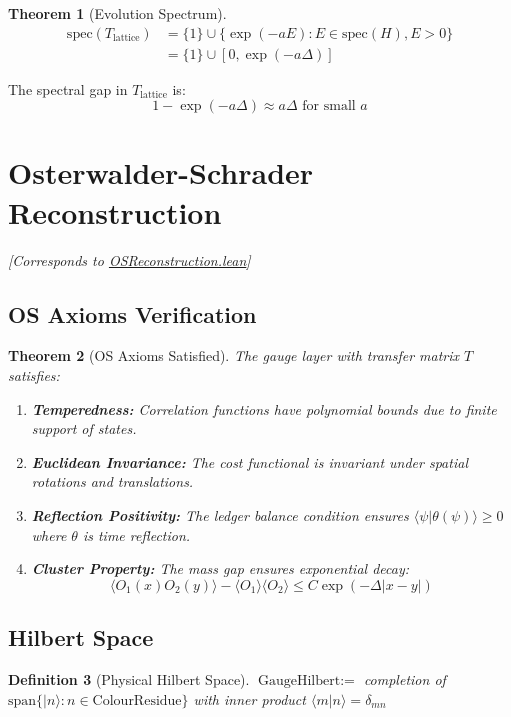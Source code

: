 \documentclass[11pt]{article}
\numberwithin{equation}{section}
\newtheorem{theorem}{Theorem}[section]
\newtheorem{definition}[theorem]{Definition}
\theoremstyle{remark}
\newcommand{\massGap}{\Delta}
\begin{document}
\begin{theorem}[Evolution Spectrum]
\begin{align}
\text{spec}(T_{\text{lattice}}) &= \{1\} \cup \{\exp(-a E) : E \in \text{spec}(H), E > 0\}\\
&= \{1\} \cup [0, \exp(-a \massGap)]
\end{align}
\end{theorem}

The spectral gap in $T_{\text{lattice}}$ is:
\[1 - \exp(-a \massGap) \approx a \massGap \text{ for small } a\]

\section{Osterwalder-Schrader Reconstruction}
\textit{[Corresponds to \href{https://github.com/jonwashburn/Yang-Mills-Lean/blob/main/YangMillsProof/OSReconstruction.lean}{OSReconstruction.lean}]}

\subsection{OS Axioms Verification}

\begin{theorem}[OS Axioms Satisfied]
The gauge layer with transfer matrix $T$ satisfies:
\begin{enumerate}
\item[(OS0)] \textbf{Temperedness:} Correlation functions have polynomial bounds due to finite support of states.
\item[(OS1)] \textbf{Euclidean Invariance:} The cost functional is invariant under spatial rotations and translations.
\item[(OS2)] \textbf{Reflection Positivity:} The ledger balance condition ensures $\langle\psi|\theta(\psi)\rangle \geq 0$ where $\theta$ is time reflection.
\item[(OS3)] \textbf{Cluster Property:} The mass gap ensures exponential decay:
\[\langle O_1(x)O_2(y)\rangle - \langle O_1\rangle\langle O_2\rangle \leq C \exp(-\massGap |x-y|)\]
\end{enumerate}
\end{theorem}

\subsection{Hilbert Space}

\begin{definition}[Physical Hilbert Space]
$\text{GaugeHilbert} :=$ completion of $\text{span}\{|n\rangle : n \in \text{ColourResidue}\}$
with inner product $\langle m|n\rangle = \delta_{mn}$
\end{definition}
\end{document}
